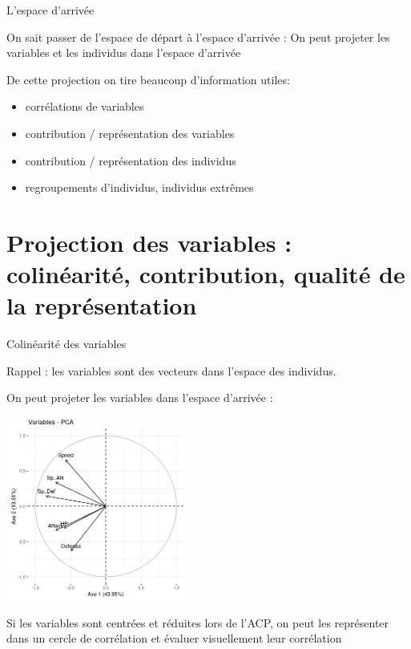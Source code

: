 \documentclass{beamer}
\begin{document}
\begin{frame}{L'espace d'arrivée}

On sait passer de l'espace de départ à l'espace d'arrivée : 
On peut \alert{projeter} les variables et les individus dans l'espace d'arrivée

\medskip

De cette projection on tire beaucoup d'information utiles: 


\begin{itemize}
\item \alert{corrélations} de variables
\item \alert{contribution / représentation}  des variables 
\item \alert{contribution / représentation} des individus 
\item \alert{regroupements} d'individus, individus extrêmes
\end{itemize}
\end{frame}



\section{Projection des variables : colinéarité, contribution, qualité de la représentation}



\begin{frame}{Colinéarité des variables}

Rappel : les variables sont des vecteurs dans l'espace des individus. 

On peut projeter les variables dans l'espace d'arrivée : 

\begin{center}
\includegraphics[width=0.45\textwidth,keepaspectratio]{img/cercle_trigo_ACP_var.png}
\end{center}
\begin{spacing}{0.7}
\begin{small}
Si les variables sont \alert{centrées et réduites} lors de l'ACP, on peut les représenter dans un \alert{cercle de corrélation} et évaluer visuellement leur  corrélation
\end{small}
\end{spacing}

\end{frame}
\end{document}
